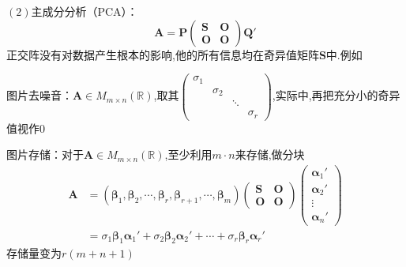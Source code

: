 $(2)$主成分分析（PCA）：\[
\bm{A}=\bm{P}\begin{pmatrix}
    \bm{S}&\bm{O}\\
    \bm{O}&\bm{O}
\end{pmatrix}\bm{Q}'
\]正交阵没有对数据产生根本的影响,他的所有信息均在奇异值矩阵$\bm{S}$中.例如\begin{enumerate}[label=\textup{[\arabic*]}]
    \item 图片去噪音：$\bm{A}\in M_{m\times n}\left(\mathbb{R}\right)$,取其$\begin{pmatrix}
        \sigma_1&&&\\
        &\sigma_2&&\\
        &&\ddots&\\
        &&&\sigma_r
    \end{pmatrix}$,实际中,再把充分小的奇异值视作$0$
    \item 图片存储：对于$\bm{A}\in M_{m\times n}\left(\mathbb{R}\right)$,至少利用$m\cdot n$来存储,做分块\begin{align*}
    \bm{A}&=\left(
        \bm{\beta}_1,\bm{\beta}_2,\cdots,\bm{\beta}_r,\bm{\beta}_{r+1},\cdots,\bm{\beta}_m
    \right)\begin{pmatrix}
        \bm{S}&\bm{O}\\
        \bm{O}&\bm{O}
    \end{pmatrix}\begin{pmatrix}
        \bm{\alpha}_1'\\\bm{\alpha}_2'\\\vdots\\\bm{\alpha}_n'
    \end{pmatrix}\\
    &=\sigma_1\bm{\beta}_1\bm{\alpha}_1'+\sigma_2\bm{\beta}_2\bm{\alpha}_2'+\cdots+\sigma_r\bm{\beta}_r\bm{\alpha}_r'
\end{align*}存储量变为$r\left(
    m+n+1
\right)$
\end{enumerate}

